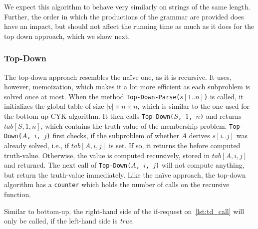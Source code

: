 We expect this algorithm to behave very similarly on strings of the same length.
Further, the order in which the productions of the grammar are provided does have an impact, but should not affect the running time as much as it does for the top down approach, which we show next.

\subsubsection{Top-Down}
\label{sec:top_down}
The top-down approach resembles the na\"{i}ve one, as it is recursive.
It uses, however, memoization, which makes it a lot more efficient as each subproblem is solved once at most.
When the method \texttt{Top-Down-Parse($s[1..n]$)} is called, it initializes the global table of size $|v|\times n\times n$, which is similar to the one used for the bottom-up CYK algorithm.
It then calls \texttt{Top-Down($S$, $1$, $n$)} and returns $tab[S,1,n]$, which contains the truth value of the membership problem.
\texttt{Top-Down($A$, $i$, $j$)} first checks, if the subproblem of whether $A$ derives $s[i..j]$ was already solved, i.e., if $tab[A,i,j]$ is set.
If so, it returns the before computed truth-value.
Otherwise, the value is computed recursively, stored in $tab[A,i,j]$ and returned.
The next call of \texttt{Top-Down($A$, $i$, $j$)} will not compute anything, but return the truth-value immediately.
Like the na\"{i}ve approach, the top-down algorithm has a \texttt{counter} which holds the number of calls on the recursive function.

Similar to bottom-up, the right-hand side of the if-request on~\cref{lst:td_call} will only be called, if the left-hand side is \textit{true}.

